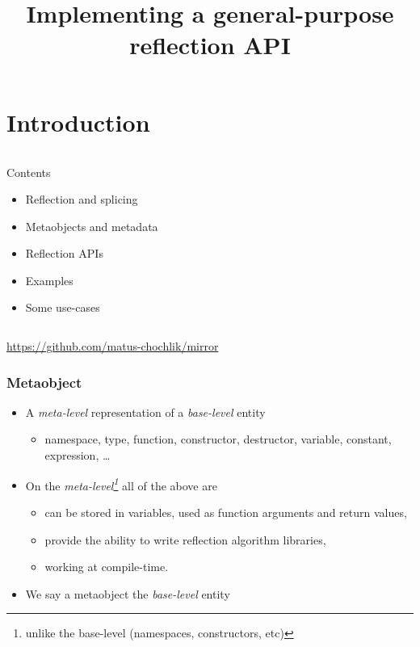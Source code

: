\documentclass[aspectratio=169,compress,table,xcolor=table]{beamer}
\begin{document}
\title{Implementing a general-purpose reflection API}
\section{Introduction}
\begin{frame}
  \begin{columns}
    \begin{column}{.32\textwidth}
      \Large
      Contents
      \normalsize
      \begin{itemize}
        \item Reflection \smaller and splicing
        \item Metaobjects and metadata
        \item Reflection APIs
        \item Examples
        \item Some use-cases
      \end{itemize}
    \end{column}
    \begin{column}{.70\textwidth}
    \end{column}
  \end{columns}
  \centering
  \url{https://github.com/matus-chochlik/mirror}
\end{frame}
\begin{frame}
  \frametitle{Metaobject}
  \larger
  \begin{itemize}
    \item A {\em meta-level} representation of a {\em base-level} entity
      \begin{itemize}
      \smaller
        \item namespace, type, function, constructor, destructor, variable,
          constant, expression, \ldots
      \end{itemize}
    \item On the {\em meta-level\footnote{unlike the base-level (namespaces,
      constructors, etc)}} all
      of the above are 
      \begin{itemize}
      \smaller
        \item can be stored in variables, used as function arguments and
          return values,
        \item provide the ability to write reflection algorithm libraries,
        \item working at compile-time.
      \end{itemize}
    \item We say a metaobject  the {\em base-level} entity
  \end{itemize}
\end{frame}
\end{document}

